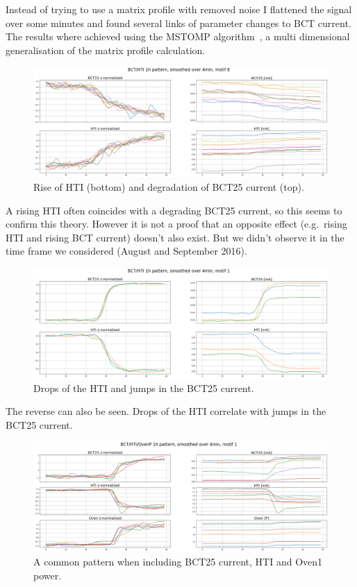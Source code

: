 \documentclass[12pt,a4paper]{article}
\begin{document}
Instead of trying to use a matrix profile with removed noise I flattened
the signal over some minutes and found several links of parameter
changes to BCT current. The results where achieved using the MSTOMP
algorithm~\cite{Yeh:MatrixProfileVI}, a multi dimensional
generalisation of the matrix profile calculation.

\begin{figure}
\centering
\includegraphics{images/hti_bct_htirise.png}
\caption{Rise of HTI (bottom) and degradation of BCT25 current (top).}
\end{figure}

A rising HTI often coincides with a degrading BCT25 current, so this
seems to confirm this theory. However it is not a proof that an opposite
effect (e.g.~rising HTI and rising BCT current) doesn't also exist. But
we didn't observe it in the time frame we considered (August and
September 2016).

\begin{figure}
\centering
\includegraphics{images/hti_bct_htifall.png}
\caption{Drops of the HTI and jumps in the BCT25 current.}
\end{figure}

The reverse can also be seen. Drops of the HTI correlate with jumps in
the BCT25 current.

\begin{figure}
\centering
\includegraphics{images/bct_oven_hti.png}
\caption{A common pattern when including BCT25 current, HTI and Oven1
power.}
\end{figure}
\end{document}
